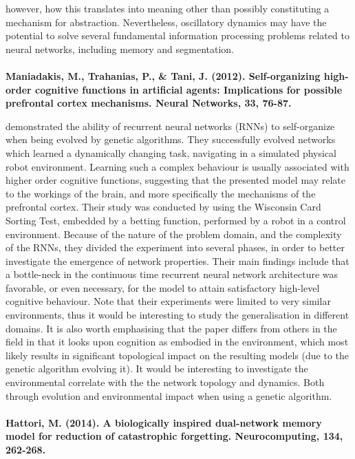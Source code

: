 however, how this translates into meaning other than possibly constituting a mechanism for abstraction. Nevertheless, oscillatory dynamics may have the potential to solve several fundamental information processing problems related to neural networks, including memory and segmentation.
\\
\\
\textbf{Maniadakis, M., Trahanias, P., \& Tani, J. (2012). Self-organizing high-order cognitive functions in artificial agents: Implications for possible prefrontal cortex mechanisms. Neural Networks, 33, 76-87.}

\cite{Maniadakis2012} demonstrated the ability of recurrent neural networks (RNNs) to self-organize when being evolved by genetic algorithms. They successfully evolved networks which learned a dynamically changing task, navigating in a simulated physical robot environment. Learning such a complex behaviour is usually associated with higher order cognitive functions, suggesting that the presented model may relate to the workings of the brain, and more specifically the mechanisms of the prefrontal cortex.
Their study was conducted by using the Wisconsin Card Sorting Test, embedded by a betting function, performed by a robot in a control environment. Because of the nature of the problem domain, and the complexity of the RNNs, they divided the experiment into several phases, in order to better investigate the emergence of network properties. Their main findings include that a bottle-neck in the continuous time recurrent neural network architecture was favorable, or even necessary, for the model to attain satisfactory high-level cognitive behaviour. Note that their experiments were limited to very similar environments, thus it would be interesting to study the generalisation in different domains. It is also worth emphasising that the paper differs from others in the field in that it looks upon cognition as embodied in the environment, which most likely results in significant topological impact on the resulting models (due to the genetic algorithm evolving it). It would be interesting to investigate the environmental correlate with the the network topology and dynamics. Both through evolution and environmental impact when using a genetic algorithm.
\\
\\
\textbf{Hattori, M. (2014). A biologically inspired dual-network memory model for reduction of catastrophic forgetting. Neurocomputing, 134, 262-268.}

